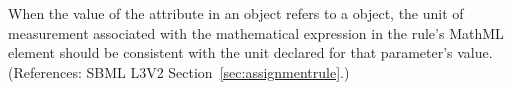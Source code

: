 When the value of the attribute  in an \AssignmentRule
object refers to a \Parameter object, the unit of measurement associated
with the mathematical expression in the rule's MathML  element
should be consistent with the unit declared for that parameter's value.
(References: SBML L3V2 Section~\ref{sec:assignmentrule}.)
